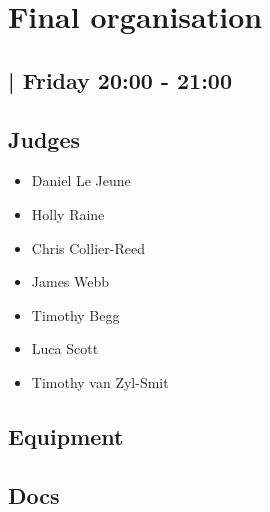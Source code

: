 \documentclass[10pt]{article}
\begin{document}
		\begin{minipage}{\linewidth}
		\setcounter{section}{7}
	\section{Final organisation }
	\subsection*{ | Friday 20:00 - 21:00}

	

	\begin{multicols}{2}
	\subsection*{\faUsers \: Judges}
	\begin{itemize}
			\item Daniel Le Jeune
			\item Holly Raine
			\item Chris Collier-Reed
			\item James Webb
			\item Timothy Begg
			\item Luca Scott
			\item Timothy van Zyl-Smit
		\end{itemize}
	\columnbreak
	\subsection*{\faWrench \: Equipment}
	        \vfill\null
        \subsection*{\faFile \: Docs}
     	\end{multicols}


	\vspace{1cm}
	\end{minipage}
\end{document}
